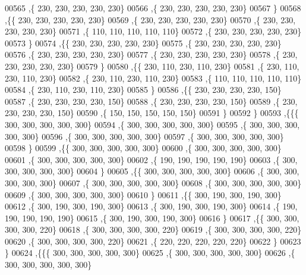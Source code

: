 \begin{DoxyCode}
00565    ,\{   230,   230,   230,   230,   230\}
00566    ,\{   230,   230,   230,   230,   230\}
00567    \}
00568   ,\{\{   230,   230,   230,   230,   230\}
00569    ,\{   230,   230,   230,   230,   230\}
00570    ,\{   230,   230,   230,   230,   230\}
00571    ,\{   110,   110,   110,   110,   110\}
00572    ,\{   230,   230,   230,   230,   230\}
00573    \}
00574   ,\{\{   230,   230,   230,   230,   230\}
00575    ,\{   230,   230,   230,   230,   230\}
00576    ,\{   230,   230,   230,   230,   230\}
00577    ,\{   230,   230,   230,   230,   230\}
00578    ,\{   230,   230,   230,   230,   230\}
00579    \}
00580   ,\{\{   230,   110,   230,   110,   230\}
00581    ,\{   230,   110,   230,   110,   230\}
00582    ,\{   230,   110,   230,   110,   230\}
00583    ,\{   110,   110,   110,   110,   110\}
00584    ,\{   230,   110,   230,   110,   230\}
00585    \}
00586   ,\{\{   230,   230,   230,   230,   150\}
00587    ,\{   230,   230,   230,   230,   150\}
00588    ,\{   230,   230,   230,   230,   150\}
00589    ,\{   230,   230,   230,   230,   150\}
00590    ,\{   150,   150,   150,   150,   150\}
00591    \}
00592   \}
00593  ,\{\{\{   300,   300,   300,   300,   300\}
00594    ,\{   300,   300,   300,   300,   300\}
00595    ,\{   300,   300,   300,   300,   300\}
00596    ,\{   300,   300,   300,   300,   300\}
00597    ,\{   300,   300,   300,   300,   300\}
00598    \}
00599   ,\{\{   300,   300,   300,   300,   300\}
00600    ,\{   300,   300,   300,   300,   300\}
00601    ,\{   300,   300,   300,   300,   300\}
00602    ,\{   190,   190,   190,   190,   190\}
00603    ,\{   300,   300,   300,   300,   300\}
00604    \}
00605   ,\{\{   300,   300,   300,   300,   300\}
00606    ,\{   300,   300,   300,   300,   300\}
00607    ,\{   300,   300,   300,   300,   300\}
00608    ,\{   300,   300,   300,   300,   300\}
00609    ,\{   300,   300,   300,   300,   300\}
00610    \}
00611   ,\{\{   300,   190,   300,   190,   300\}
00612    ,\{   300,   190,   300,   190,   300\}
00613    ,\{   300,   190,   300,   190,   300\}
00614    ,\{   190,   190,   190,   190,   190\}
00615    ,\{   300,   190,   300,   190,   300\}
00616    \}
00617   ,\{\{   300,   300,   300,   300,   220\}
00618    ,\{   300,   300,   300,   300,   220\}
00619    ,\{   300,   300,   300,   300,   220\}
00620    ,\{   300,   300,   300,   300,   220\}
00621    ,\{   220,   220,   220,   220,   220\}
00622    \}
00623   \}
00624  ,\{\{\{   300,   300,   300,   300,   300\}
00625    ,\{   300,   300,   300,   300,   300\}
00626    ,\{   300,   300,   300,   300,   300\}

\end{DoxyCode}
